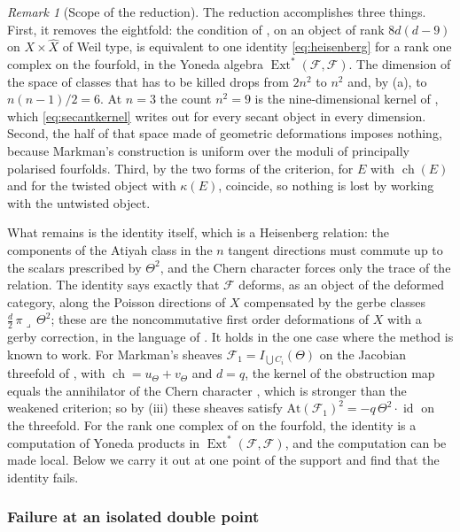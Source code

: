\documentclass[11pt,reqno]{amsart}
\theoremstyle{plain}
\theoremstyle{definition}
\theoremstyle{remark}
\newtheorem{remark}[theorem]{Remark}
\newcommand{\cF}{\mathcal{F}}
\DeclareMathOperator{\ch}{ch}
\DeclareMathOperator{\Ext}{Ext}
\DeclareMathOperator{\id}{id}
\begin{document}
\begin{remark}[Scope of the reduction]\label{rem:factorclosed}
The reduction accomplishes three things. First, it removes the eightfold:
the condition of , on an object of rank $8d(d-9)$ on
$X\times\widehat X$ of Weil type, is equivalent to one identity
\eqref{eq:heisenberg} for a rank one complex on the fourfold, in the Yoneda
algebra $\Ext^{*}(\cF,\cF)$. The dimension of the space of classes that has
to be killed drops from $2n^{2}$ to $n^{2}$ and, by (a), to $n(n-1)/2=6$. At
$n=3$ the count $n^{2}=9$ is the nine-dimensional kernel of
\cite[Corollaries 8.3.12 and 8.5.2]{Mar25a}, which \eqref{eq:secantkernel}
writes out for every secant object in every dimension. Second, the half of
that space made of geometric deformations imposes nothing, because Markman's
construction is uniform over the moduli of principally polarised fourfolds.
Third, by  the two forms of the criterion, for $E$ with
$\ch(E)$ and for the twisted object with $\kappa(E)$, coincide, so nothing
is lost by working with the untwisted object.

What remains is the identity itself, which is a Heisenberg relation: the
components of the Atiyah class in the $n$ tangent directions must commute up
to the scalars prescribed by $\Theta^{2}$, and the Chern character forces
only the trace of the relation. The identity says exactly that $\cF$
deforms, as an object of the deformed category, along the Poisson directions
of $X$ compensated by the gerbe classes $\tfrac d2\,\pi\lrcorner\,\Theta^{2}$;
these are the noncommutative first order deformations of $X$ with a gerby
correction, in the language of \cite[Section 8.5]{Mar25a}. It holds in the
one case where the method is known to work. For Markman's sheaves
$\cF_{1}=I_{\bigcup C_{i}}(\Theta)$ on the Jacobian threefold of
\cite[Section 11.1]{Mar25b}, with $\ch=u_{\Theta}+v_{\Theta}$ and $d=q$, the
kernel of the obstruction map equals the annihilator of the Chern character
\cite[Corollary 8.3.12]{Mar25a}, which is stronger than the weakened
criterion; so by (iii) these sheaves satisfy
$\mathrm{At}(\cF_{1})^{2}=-q\,\Theta^{2}\cdot\id$ on the threefold. For the
rank one complex of  on the fourfold, the identity is a
computation of Yoneda products in $\Ext^{*}(\cF,\cF)$, and the computation
can be made local. Below we carry it out at one point of the support and
find that the identity fails.
\end{remark}

\subsubsection*{Failure at an isolated double point}
\end{document}
